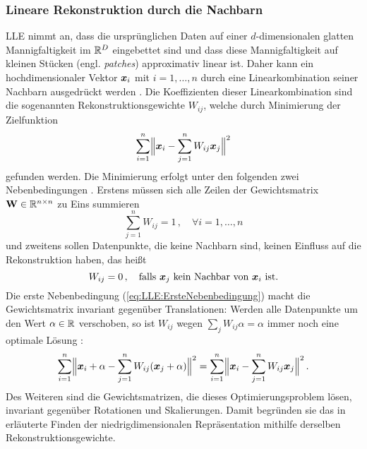 \subsubsection{Lineare Rekonstruktion durch die Nachbarn}
\label{ch:MethodenDerDimRed:statistisch:LLE:LineareRekonstruktion}
LLE nimmt an, dass die ursprünglichen Daten auf einer $d$-dimensionalen glatten Mannigfaltigkeit im $\real^D$ eingebettet sind und dass diese Mannigfaltigkeit auf kleinen Stücken (engl. \textit{patches}) approximativ linear ist. Daher kann ein hochdimensionaler Vektor $\vect{x}_i$ mit $i = 1,\ldots,n$ durch eine Linearkombination seiner Nachbarn
ausgedrückt werden \parencite[2323]{Roweis.2000}. Die Koeffizienten dieser Linearkombination sind die sogenannten
Rekonstruktionsgewichte $W_{ij}$, welche durch Minimierung der Zielfunktion
\begin{equation}
	\label{eq:LLE:Zielfunktion}
	\sum_{i = 1}^n \norm[\Big]{ \vect{x}_i - \sum_{j = 1}^n W_{ij}\vect{x}_j}^2
\end{equation}
gefunden werden. Die Minimierung erfolgt unter den folgenden zwei Nebenbedingungen \parencite[2]{Roweis.2000}. Erstens müssen sich alle Zeilen der Gewichtsmatrix $\mat{W} \in \real^{n
		\times n}$ zu Eins summieren
\begin{equation}
	\label{eq:LLE:ErsteNebenbedingung}
	\sum_{j = 1}^nW_{ij} = 1 \, , \quad \forall i = 1, \ldots, n
\end{equation}
und zweitens sollen Datenpunkte, die keine Nachbarn sind, keinen Einfluss auf die Rekonstruktion haben, das heißt
\begin{equation}
	\label{eq:LLE:ZweiteNebenbedingung}
	W_{ij} = 0 \, , \quad \text{falls } \vect{x}_j \text{ kein Nachbar von } \vect{x}_i \text{ ist.}
\end{equation}
Die erste Nebenbedingung (\eqref{eq:LLE:ErsteNebenbedingung}) macht die Gewichtsmatrix invariant gegenüber Translationen: Werden alle Datenpunkte um den Wert $\alpha \in \real$ verschoben, so ist $W_{ij}$ wegen $\sum_j W_{ij}\alpha = \alpha$ immer noch eine optimale Lösung \parencite[8]{Cayton.2005}:
\begin{equation}
	\sum_{i = 1}^n \norm[\Big]{ \vect{x}_i + \alpha - \sum_{j = 1}^n W_{ij}(\vect{x}_j + \alpha)}^2 = \sum_{i = 1}^n \norm[\Big]{ \vect{x}_i - \sum_{j = 1}^n W_{ij}\vect{x}_j}^2 \, .
\end{equation}
Des Weiteren sind die Gewichtsmatrizen, die dieses Optimierungsproblem lösen, invariant gegenüber Rotationen und Skalierungen. Damit begründen sie das in  erläuterte Finden der niedrigdimensionalen Repräsentation mithilfe derselben Rekonstruktionsgewichte.

